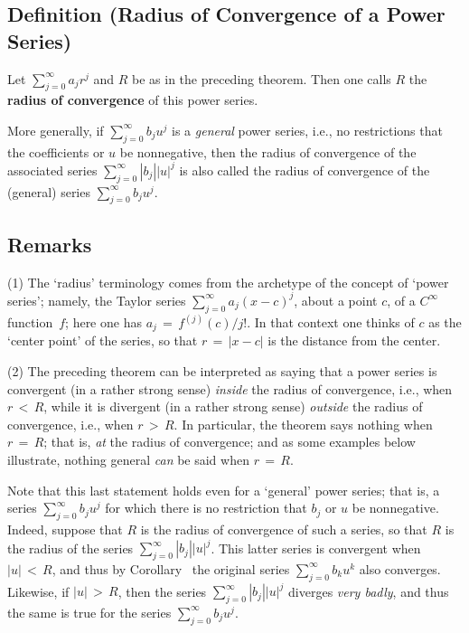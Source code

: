 \V
\V

        \subsection{\small{{\bf Definition}} (Radius of Convergence of a Power Series)}
        \label{ThmG50.30}

\V

        Let $\sum_{j=0}^{{\infty}} a_{j}r^{j}$ and $R$ be as in the preceding theorem.
    Then one calls $R$ the {\bf radius of convergence} of this power series.

        More generally, if $\sum_{j=0}^{{\infty}} b_{j}u^{j}$ is a {\em general} power series,
    i.e., no restrictions that the coefficients or $u$ be nonnegative, then the radius of convergence of the associated series $\sum_{j=0}^{{\infty}} |b_{j}||u|^{j}$
    is also called the radius of convergence of the (general) series $\sum_{j=0}^{{\infty}} b_{j}u^{j}$.

\V


        \subsection{\small{{\bf Remarks}}}
        \label{RemrkG50.40}

\V

\hspace*{\parindent}(1) The `radius' terminology comes from the archetype of the concept of `power series';
    namely, the Taylor series $\sum_{j=0}^{{\infty}} a_{j}(x-c)^{j}$, about a point $c$, of a $C^{{\infty}}$ function~$f$;
    here one has $a_{j} \,=\, f^{(j)}(c)/j!$.
    In that context one thinks of $c$ as the `center point' of the series, so that $r \,=\, |x-c|$ is the distance from the center.

\V


       (2) The preceding theorem can be interpreted as saying that a power series is convergent (in a rather strong sense) {\em inside} the radius of convergence, i.e., when $r\,<\,R$,
    while it is divergent (in a rather strong sense) {\em outside} the radius of convergence, i.e., when $r\,>\,R$.
    In particular, the theorem says nothing when $r \,=\, R$; that is, {\em at} the radius of convergence;
    and as some examples below illustrate, nothing general {\em can} be said when $r \,=\, R$.

        Note that this last statement holds even for a `general' power series; that is,
    a series $\sum_{j=0}^{{\infty}} b_{j}u^{j}$ for which there is no restriction that $b_{j}$ or $u$ be nonnegative.
    Indeed, suppose that $R$ is the radius of convergence of such a series, so that $R$ is the radius of the series $\sum_{j=0}^{{\infty}} |b_{j}||u|^{j}$.
    This latter series is convergent when $|u|\,<\,R$, and thus by Corollary~ the original series $\sum_{j=0}^{{\infty}} b_{k}u^{k}$  also converges.
    Likewise, if $|u|\,>\,R$, then the series $\sum_{j=0}^{{\infty}} |b_{j}||u|^{j}$ diverges {\em very badly},
    and thus the same is true for the series $\sum_{j=0}^{{\infty}} b_{j}u^{j}$.

